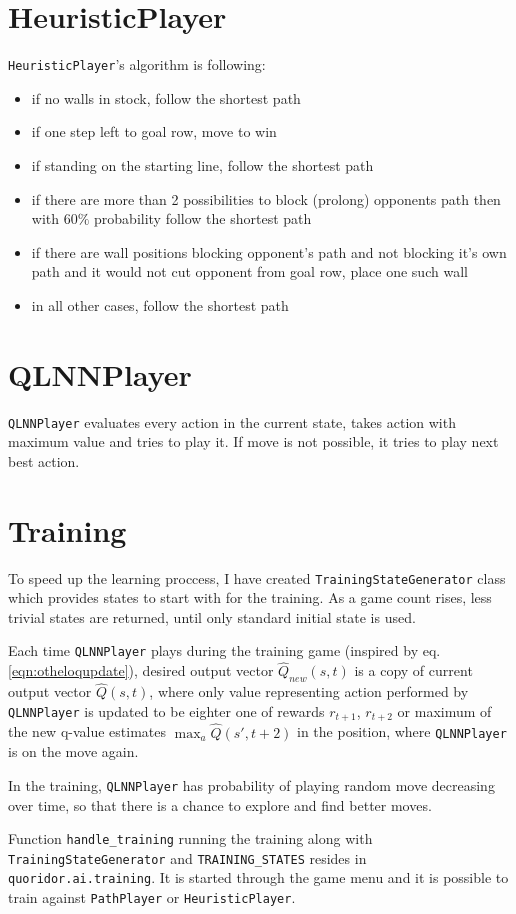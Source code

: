 \section{HeuristicPlayer}
{\lstinline{HeuristicPlayer}}'s algorithm is following:
\begin{itemize}
  \vspace*{-0.25cm}
  \setlength\itemsep{-0.15cm}

  \item if no walls in stock, follow the shortest path
  \item if one step left to goal row, move to win
  \item if standing on the starting line, follow the shortest path
  \item if there are more than 2 possibilities to block (prolong) opponents
        path then with $60\%$ probability follow the shortest path
  \item if there are wall positions blocking opponent's path and not
        blocking it's own path and it would not cut opponent from goal row,
        place one such wall
  \item in all other cases, follow the shortest path

  \vspace*{-0.25cm}
\end{itemize}

\section{QLNNPlayer}
{\lstinline{QLNNPlayer}} evaluates every action in the current state, takes action
with maximum value and tries to play it. If move is not possible, it tries to
play next best action.

\section{Training}
To speed up the learning proccess, I have created
{\lstinline{TrainingStateGenerator}} class which provides states
to start with for the training. As a game count rises, less trivial states are
returned, until only standard initial state is used.

Each time {\lstinline{QLNNPlayer}} plays during the training game (inspired
by eq. \ref{eqn:otheloqupdate}), desired output vector $\hat{Q}_{new}(s, t)$
is a copy of current output vector $\hat{Q}(s, t)$,
where only value representing action performed by {\lstinline{QLNNPlayer}}
is updated to be eighter one of rewards $r_{t+1}$, $r_{t+2}$ or maximum of
the new q-value estimates $\displaystyle{\max_a}\hat{Q}(s', t{+}2)$
in the position, where {\lstinline{QLNNPlayer}} is on the move again.

In the training, {\lstinline{QLNNPlayer}} has probability of
playing random move decreasing over time, so that there is a chance to explore
and find better moves.

Function {\lstinline{handle_training}} running the training along with
{\lstinline{TrainingStateGenerator}} and {\lstinline{TRAINING_STATES}}
resides in {\lstinline{quoridor.ai.training}}. It is started through the game
menu and it is possible to train against {\lstinline{PathPlayer}} or
{\lstinline{HeuristicPlayer}}.
